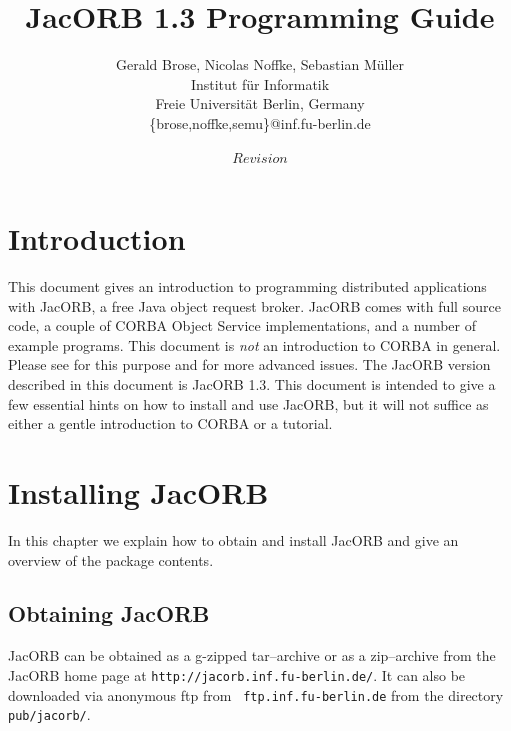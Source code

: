 \documentclass[12pt]{scrbook}
\title{JacORB 1.3 Programming Guide}
\author{Gerald Brose, Nicolas Noffke, Sebastian M\"uller\\
Institut f\"ur Informatik\\
Freie Universit\"at Berlin, Germany\\
\{brose,noffke,semu\}@inf.fu-berlin.de\\
\\
$Revision$
}
\begin{document}
\newcommand{\cmdline}[1]{\begin{small}\noindent \texttt{\$ #1}\end{small}}

\maketitle


\setlength{\parskip}{1.1ex}
\newpage
\tableofcontents

\chapter{Introduction}

This  document  gives   an  introduction  to  programming  distributed
applications with  JacORB, a free  Java object request  broker. JacORB
comes  with  full  source  code,  a couple  of  CORBA  Object  Service
implementations, and  a number of example programs.   This document is
{\it  not}   an  introduction  to   CORBA  in  general.    Please  see
\cite{Brose2001a,Siegel2000,   Vinoski1997}  for   this   purpose  and
\cite{Henning1999}  for  more  advanced  issues.  The  JacORB  version
described in this document is JacORB 1.3. This document is intended to
give a  few essential hints on how  to install and use  JacORB, but it
will  not  suffice as  either  a gentle  introduction  to  CORBA or  a
tutorial.


\chapter{Installing JacORB}
\label{Ch_installing}

In this chapter  we explain how to obtain and  install JacORB and give
an overview of the package contents.

\section{Obtaining JacORB}

JacORB can be obtained as a g-zipped tar--archive or as a zip--archive
from the  JacORB home page  at \verb+http://jacorb.inf.fu-berlin.de/+.
It   can   also   be   downloaded   via  anonymous   ftp   from   {\tt
ftp.inf.fu-berlin.de} from the directory {\tt pub/jacorb/}.
\end{document}
